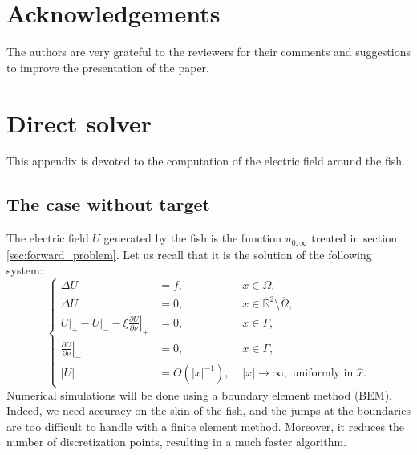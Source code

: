 \documentclass[final]{siamltex}
\numberwithin{equation}{section}
\numberwithin{figure}{section}
\numberwithin{table}{section}
\begin{document}
\section*{Acknowledgements}
The authors are very grateful to the reviewers for their comments
and suggestions to improve the presentation of the paper.

\appendix
\section{Direct solver}

\label{sub:direct-problem-numeric}

This appendix is devoted to the computation of the electric field
around the fish.

\subsection{The case without target}

The electric field $U$ generated by the fish is the function
$u_{0,\infty}$ treated in section \ref{sec:forward_problem}. Let
us recall that it is the solution of the following system:
\begin{equation}
\left\{ \begin{alignedat}{2}\Delta U & ={f}, & \,\, x\in\Omega,\\
\Delta U & =0, & \,\, x\in\mathbb{R}^{2}\setminus\overline{\Omega},\\
U\big|_+ - U\big|_- -\xi\left.\frac{\partial U}{\partial\nu}\right|_{+} & =0, & \,\, x\in\Gamma,\\
\left.\frac{\partial U}{\partial\nu}\right|_{-} & =0, & \,\, x\in\Gamma,\\
\left|U\right| & = {O}(\left|x\right|^{-1}), &
\,\,\left|x\right|\rightarrow\infty,\text{ uniformly in }\hat{x}.
\end{alignedat}
\right.\label{eq:sytem-U-developped}
\end{equation}
Numerical simulations will be done using a boundary element method
(BEM). Indeed, we need accuracy on the skin of the fish, and the
jumps at the boundaries are too difficult to handle with a finite
element method. Moreover, it reduces the number of discretization
points, resulting in a much faster algorithm.
\end{document}
